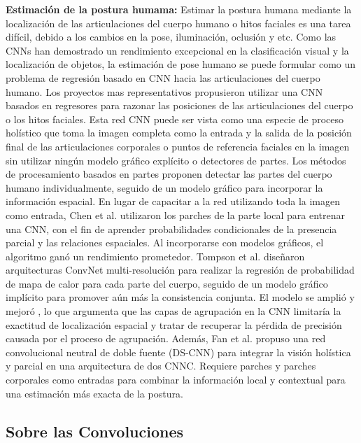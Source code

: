 \textbf{Estimación de la postura humama:}  Estimar la postura humana mediante la localización de las articulaciones del cuerpo humano o hitos faciales es una tarea difícil, debido a los cambios en la pose, iluminación, oclusión y etc. Como las CNNs han demostrado un rendimiento excepcional en la clasificación visual y la localización de objetos, la estimación de pose humano se puede formular como un problema de regresión basado en CNN hacia las articulaciones del cuerpo humano. Los proyectos mas representativos \cite{Toshev,Li} propusieron utilizar una  CNN basados en regresores para razonar las posiciones de las articulaciones del cuerpo o los hitos faciales.  Esta red CNN   puede ser vista como una especie de proceso holístico que toma la imagen completa como la entrada y la salida de la posición final de las articulaciones corporales o puntos de referencia faciales en la imagen sin utilizar ningún modelo gráfico explícito o detectores de partes. Los métodos de procesamiento basados en partes proponen detectar las partes del cuerpo humano individualmente, seguido de un modelo gráfico para incorporar la información espacial. En lugar de capacitar a la red utilizando toda la imagen como entrada, Chen et al.  \cite{ChenX} utilizaron los parches de la parte local para entrenar una CNN, con el fin de aprender probabilidades condicionales de la presencia parcial y las relaciones espaciales. Al incorporarse con modelos gráficos, el algoritmo ganó un rendimiento prometedor. Tompson et al. \cite{Tompson} diseñaron arquitecturas ConvNet multi-resolución para realizar la regresión de probabilidad de mapa de calor para cada parte del cuerpo, seguido de un modelo gráfico implícito para promover aún más la consistencia conjunta. El modelo se amplió y mejoró  \cite{Tompson}, lo que argumenta que las capas de agrupación en la CNN limitaría la exactitud de localización espacial y tratar de recuperar la pérdida de precisión causada por el proceso de agrupación. Además, Fan et al.  \cite{Fan} propuso una red convolucional neutral de doble fuente (DS-CNN) para integrar la visión holística y parcial en una arquitectura de dos CNNC. Requiere parches y parches corporales como entradas para combinar la información local y contextual para una estimación más exacta de la postura.

\subsection{Sobre las Convoluciones}

